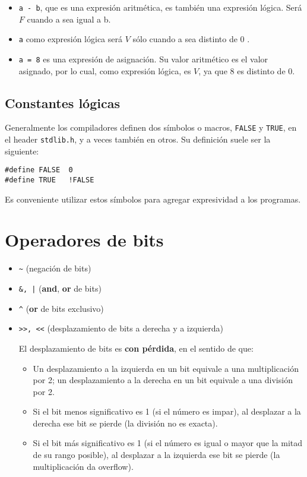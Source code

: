 \begin{ejemplo}
\noindent
\begin{itemize}
\item \lstinline{a - b}, que es una expresión aritmética, es también una expresión lógica. Será $F$ cuando a sea igual a b.
\item \lstinline{a} como expresión lógica será $V$ sólo cuando a sea distinto de 0 .

\item \lstinline{a = 8} es una expresión de asignación. Su valor aritmético es el valor asignado, por lo cual, como expresión lógica, es $V$, ya que 8 es distinto de 0.

\end{itemize}
\end{ejemplo}

\subsection{Constantes lógicas}
Generalmente los compiladores definen dos símbolos o macros, \lstinline{FALSE} y \lstinline{TRUE}, en el header \lstinline{stdlib.h}, y a veces también en otros. Su definición suele ser la siguiente:

\begin{lstlisting}
#define FALSE  0
#define TRUE   !FALSE   
\end{lstlisting}
    
Es conveniente utilizar estos símbolos para agregar expresividad a los programas.

\section{Operadores de bits}
\begin{itemize}
	\item \lstinline{~} (negación de bits)
	\item \lstinline{&, |} (\textbf{and}, \textbf{or} de bits)
	\item \lstinline{^} (\textbf{or} de bits exclusivo)
	\item \lstinline{>>, <<} (desplazamiento de bits a derecha y a izquierda)

El desplazamiento de bits es \textbf{con pérdida}, en el sentido de que:
\begin{itemize}
	\item Un desplazamiento a la izquierda en un bit equivale a una multiplicación por 2; un desplazamiento a la derecha en un bit equivale a una división por 2. 
	\item Si el bit menos significativo es 1 (si el número es impar), al desplazar a la derecha ese bit se pierde (la división no es exacta).
	\item Si el bit más significativo es 1 (si el número es igual o mayor que la mitad de su rango posible), al desplazar a la izquierda ese bit se pierde (la multiplicación da overflow).
\end{itemize}
\end{itemize}

